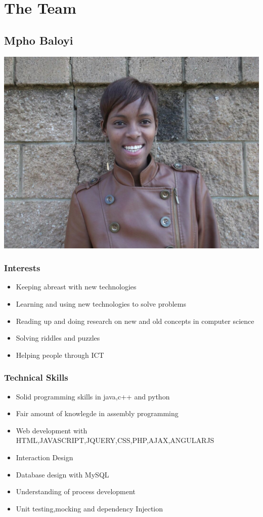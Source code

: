 \documentclass[a4paper,12pt]{article}
\begin{document}
\section{The Team}
\subsection{Mpho Baloyi}
\includegraphics[width=\textwidth]{images/Mpho}
\subsubsection{Interests}
\begin{itemize}
\item Keeping abreast with new technologies
\item Learning and using new technologies to solve problems
\item Reading up and doing research on new and old concepts in computer science
\item Solving riddles and puzzles
\item Helping people through ICT
\end{itemize}
\subsubsection{Technical Skills}
\begin{itemize}
\item Solid programming skills in java,c++ and python
\item Fair amount of knowlegde in assembly programming
\item Web development with HTML,JAVASCRIPT,JQUERY,CSS,PHP,AJAX,ANGULARJS
\item Interaction Design
\item Database design with MySQL
\item Understanding of process development
\item Unit testing,mocking and dependency Injection
\end{itemize}
\end{document}
